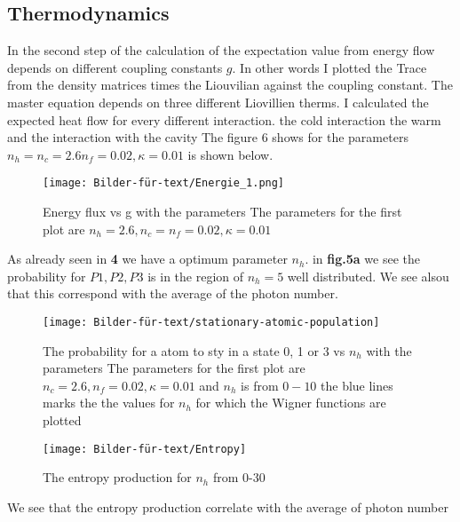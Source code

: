 \documentclass[12pt,a4paper]{article}
\begin{document}
\subsection{Thermodynamics}
In the second step of the calculation of the  expectation value from energy flow depends on different coupling constants $g$.
In other words I plotted the Trace from the density matrices times the Liouvilian against the coupling constant.
The master equation depends on three different Liovillien therms. I calculated the expected heat flow for every different interaction. the cold interaction the warm and the interaction with the cavity
The figure 6 shows  for the parameters $n_h=n_c=2.6 n_f=0.02,\kappa=0.01 $ is shown below.

\begin{figure}[hbtp]
\centering
\texttt{[image: Bilder-für-text/Energie\_1.png]}
\caption{Energy flux vs g with the parameters The parameters for the first plot are $ n_h=2.6,n_c= n_f=0.02,\kappa=0.01 $}
\end{figure}

As already seen in \textbf{4} we have a optimum parameter $n_h$.  in \textbf{fig.5a} we see the probability for $P1,P2,P3$ is in the region of $n_h=5 $ well distributed. We see alsou that  this correspond with the average of the photon number.


\begin{figure}[hbtp]
\centering
\texttt{[image: Bilder-für-text/stationary-atomic-population]}
\caption{The probability for a atom to sty in a state 0, 1 or 3 vs $n_h$ with the parameters The parameters for the first plot are $n_c=2.6 ,n_f=0.02,\kappa=0.01 $ and $n_h$ is from $0-10$ the blue lines marks the the values for $ n_h$ for which the Wigner functions are plotted }
\end{figure}

\begin{figure}[hbtp]
\centering
\texttt{[image: Bilder-für-text/Entropy]}
\caption{The entropy production for $n_h$ from 0-30}
\end{figure}
\newpage
We see that the entropy production correlate with the average of photon number 
\end{document}

